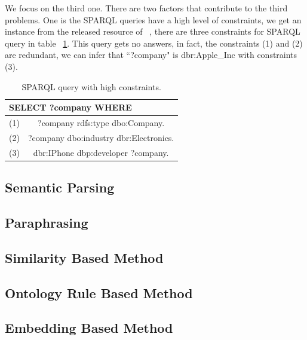 \documentclass[runningheads]{llncs}
\begin{document}
We focus on the third one.  There are two factors that contribute to the third problems. One is the SPARQL queries have a high level of constraints, we get an instance from the released resource of ~\cite{wangEmbed}, there are three constraints for SPARQL query in table ~\ref{S_Example}. This query gets no answers, in fact, the constraints (1) and (2) are redundant, we can infer that ``?company" is dbr:Apple\_Inc with constraints (3).

\begin{table}
\caption{SPARQL query with high constraints.}\label{S_Example}
\centering
\begin{tabular}{|c|c|}
\hline
\multicolumn{2}{|l|}{SELECT ?company WHERE }\\
\hline
(1) &  ?company rdfs:type dbo:Company.\\
(2) &  ?company dbo:industry dbr:Electronics.\\
(3) & dbr:IPhone dbp:developer ?company.\\
\hline
\end{tabular}
\end{table}
\subsection{Semantic Parsing}
\subsection{Paraphrasing}
\subsection{Similarity Based Method}
\subsection{Ontology Rule Based Method}
\subsection{Embedding Based Method}
\end{document}
